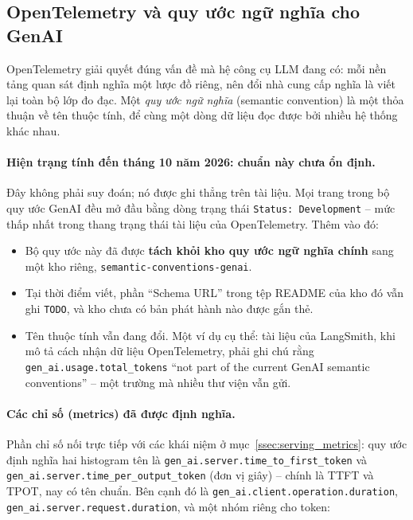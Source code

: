 \subsection{OpenTelemetry và quy ước ngữ nghĩa cho GenAI}
\label{ssec:otel_genai}

OpenTelemetry giải quyết đúng vấn đề mà hệ công cụ LLM đang có: mỗi nền tảng quan sát định nghĩa một lược đồ riêng, nên đổi nhà cung cấp nghĩa là viết lại toàn bộ lớp đo đạc. Một \emph{quy ước ngữ nghĩa} (semantic convention) là một thỏa thuận về tên thuộc tính, để cùng một dòng dữ liệu đọc được bởi nhiều hệ thống khác nhau.

\paragraph{Hiện trạng tính đến tháng 10 năm 2026: chuẩn này chưa ổn định.} Đây không phải suy đoán; nó được ghi thẳng trên tài liệu. Mọi trang trong bộ quy ước GenAI đều mở đầu bằng dòng trạng thái \texttt{Status: Development} -- mức thấp nhất trong thang trạng thái tài liệu của OpenTelemetry. Thêm vào đó:

\begin{itemize}
	\item Bộ quy ước này đã được \textbf{tách khỏi kho quy ước ngữ nghĩa chính} sang một kho riêng, \texttt{semantic-\allowbreak conventions-\allowbreak genai}.
	\item Tại thời điểm viết, phần ``Schema URL'' trong tệp README của kho đó vẫn ghi \texttt{TODO}, và kho chưa có bản phát hành nào được gắn thẻ.
	\item Tên thuộc tính vẫn đang đổi. Một ví dụ cụ thể: tài liệu của LangSmith, khi mô tả cách nhận dữ liệu OpenTelemetry, phải ghi chú rằng \texttt{gen\_\allowbreak ai.\allowbreak usage.\allowbreak total\_\allowbreak tokens} ``not part of the current GenAI semantic conventions'' -- một trường mà nhiều thư viện vẫn gửi.
\end{itemize}

\paragraph{Các chỉ số (metrics) đã được định nghĩa.} Phần chỉ số nối trực tiếp với các khái niệm ở mục~\ref{ssec:serving_metrics}: quy ước định nghĩa hai histogram tên là \texttt{gen\_\allowbreak ai.\allowbreak server.\allowbreak time\_\allowbreak to\_\allowbreak first\_\allowbreak token} và \texttt{gen\_\allowbreak ai.\allowbreak server.\allowbreak time\_\allowbreak per\_\allowbreak output\_\allowbreak token} (đơn vị giây) -- chính là TTFT và TPOT, nay có tên chuẩn. Bên cạnh đó là \texttt{gen\_\allowbreak ai.\allowbreak client.\allowbreak operation.\allowbreak duration}, \texttt{gen\_\allowbreak ai.\allowbreak server.\allowbreak request.\allowbreak duration}, và một nhóm riêng cho token:

